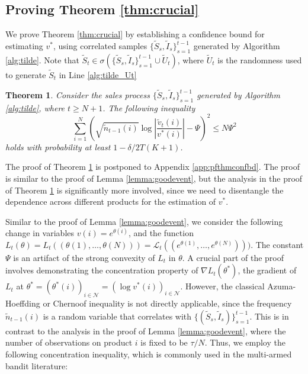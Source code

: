 \documentclass{article}
\newtheorem{theorem}{Theorem}[section]
\theoremstyle{definition}
\newcommand{\NNN}{\mathcal{N}}
\begin{document}
\subsection{Proving Theorem \ref{thm:crucial}}\label{app:crucial}
We prove Theorem \ref{thm:crucial} by establishing a confidence bound for estimating $v^*$, using correlated samples $\{\tilde{S}_s, \tilde{I}_s\}^{t-1}_{s = 1}$ generated by Algorithm \ref{alg:tilde}. Note that $\tilde{S}_t\in\sigma(\{\tilde{S}_s, \tilde{I}_s\}^{t-1}_{s = 1}\cup \tilde{U}_t)$, where $\tilde{U}_t$ is the randomness used to generate $\tilde{S}_t$ in Line \ref{alg:tilde_Ut}
\begin{theorem}\label{thm:confbd}
Consider the sales process $\{\tilde{S}_s, \tilde{I}_s\}^{t-1}_{s=1}$ generated by Algorithm \ref{alg:tilde}, where $t\geq N+1$. The following inequality
\begin{equation}\label{eq:confbd}
\sum^N_{i =1}\left(\sqrt{\tilde{n}_{t-1}(i)}\log \left|\frac{\tilde{v}_t(i)}{v^*(i)}\right| - \Psi\right)^2\leq N \Psi^2
\end{equation}
holds with probability at least $1-\delta/2T(K+1)$. %
\end{theorem}
The proof of Theorem \ref{thm:confbd} is postponed to Appendix \ref{app:pfthmconfbd}. %
The proof is similar to the proof of Lemma \ref{lemma:goodevent}, but the analysis in the proof of Theorem \ref{thm:confbd} is significantly more involved, since we need to disentangle the dependence across different products for the estimation of $v^*$.  

Similar to the proof of Lemma \ref{lemma:goodevent}, we consider the following change in variables $v(i) = e^{\theta(i)}$, and the function $L_t(\theta) = L_t((\theta(1), \ldots, \theta(N))) = \mathcal{L}_t((e^{\theta(1)}, \ldots, e^{\theta(N)})))$. The constant $\Psi$ is an artifact of the strong convexity of $L_t$ in $\theta$. A crucial part of the proof involves demonstrating the concentration property of $\nabla L_t(\theta^*)$, the gradient of $L_t$ at $\theta^* = (\theta^*(i))_{i\in \NNN} = (\log v^*(i))_{i\in \NNN}$. However, the classical Azuma-Hoeffding or Chernoof inequality is not directly applicable, since the frequency $\tilde{n}_{t-1}(i)$ is a random variable that correlates with $\{(\tilde{S}_s, \tilde{I}_s)\}^{t-1}_{s=1}$. This is in contrast to the analysis in the proof of Lemma \ref{lemma:goodevent}, where the number of observations on product $i$ is fixed to be $\tau/N$. Thus, we employ the following concentration inequality, which is commonly used in the multi-armed bandit literature:
\end{document}
